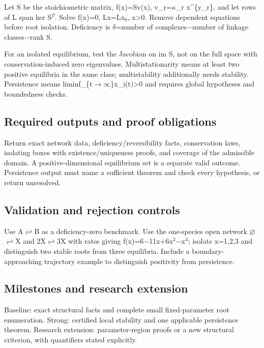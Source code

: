 \documentclass[
  11pt,
]{article}
\begin{document}
Let S be the stoichiometric matrix, f(x)=Sv(x),
v\_r=\ensuremath{\kappa}\_r x\^{}\{y\_r\}, and let rows of L span ker
S\ensuremath{{}^{T}}. Solve f(x)=0, Lx=Lx\ensuremath{{}_{0}},
x\textgreater0. Remove dependent equations before root isolation.
Deficiency is \ensuremath{\delta}=number of
complexes\ensuremath{-}number of linkage classes\ensuremath{-}rank S.

For an isolated equilibrium, test the Jacobian on im S, not on the full
space with conservation-induced zero eigenvalues. Multistationarity
means at least two positive equilibria in the same class; multistability
additionally needs stability. Persistence means
liminf\_\{t\ensuremath{\to}\ensuremath{\infty}\}x\_i(t)>0 and requires
global hypotheses and boundedness checks.

\subsection{Required outputs and proof obligations}

Return exact network data, deficiency/reversibility facts, conservation
laws, isolating boxes with existence/uniqueness proofs, and coverage of
the admissible domain. A positive-dimensional equilibrium set is a
separate valid outcome. Persistence output must name a sufficient
theorem and check every hypothesis, or return unresolved.

\subsection{Validation and rejection controls}

Use A\ensuremath{\rightleftharpoons}B as a deficiency-zero benchmark.
Use the one-species open network
\ensuremath{\varnothing}\ensuremath{\rightleftharpoons}X and
2X\ensuremath{\rightleftharpoons}3X with rates giving
f(x)=6\ensuremath{-}11x+6x\ensuremath{{}^{2}}\ensuremath{-}x\ensuremath{{}^{3}};
isolate x=1,2,3 and distinguish two stable roots from three equilibria.
Include a boundary-approaching trajectory example to distinguish
positivity from persistence.

\subsection{Milestones and research extension}

Baseline: exact structural facts and complete small fixed-parameter root
enumeration. Strong: certified local stability and one applicable
persistence theorem. Research extension: parameter-region proofs or a
new structural criterion, with quantifiers stated explicitly.
\end{document}
